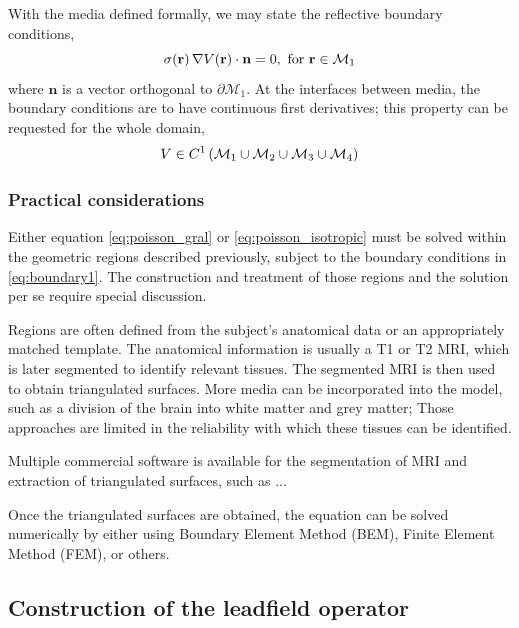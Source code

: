 With the media defined formally, we may state the reflective boundary conditions,
\begin{equation}
\sigma(\mathbf{r})\, \nabla V(\mathbf{r}) \cdot \mathbf{n} = 0, 
\text{ for } \mathbf{r} \in \mathcal{M}_1
\label{eq:boundary1}
\end{equation}
where $\mathbf{n}$ is a vector orthogonal to $\partial\mathcal{M}_1$.
%
At the interfaces between media, the boundary conditions are to have continuous first derivatives; this property can be requested for the whole domain,
\begin{equation}
    V \in C^1\left( \mathcal{M}_1 \cup \mathcal{M}_2 \cup \mathcal{M}_3 \cup \mathcal{M}_4  \right)
\end{equation}

\subsubsection{Practical considerations}

Either equation \eqref{eq:poisson_gral} or \eqref{eq:poisson_isotropic} must be solved within the geometric regions described previously, subject to the boundary conditions in \eqref{eq:boundary1}.
%
The construction and treatment of those regions and the solution per se require special discussion.

Regions are often defined from the subject's anatomical data or an appropriately matched template.
%
The anatomical information is usually a T1 or T2 MRI, which is later segmented to identify relevant tissues. The segmented MRI is then used to obtain triangulated surfaces. 
%
More media can be incorporated into the model, such as a division of the brain into white matter and grey matter;
Those approaches are limited in the reliability with which these tissues can be identified.

Multiple commercial software is available for the segmentation of MRI and extraction of triangulated surfaces, such as ...

Once the triangulated surfaces are obtained, the equation can be solved numerically by either using Boundary Element Method (BEM), Finite Element Method (FEM), or others.

\subsection{Construction of the leadfield operator}

